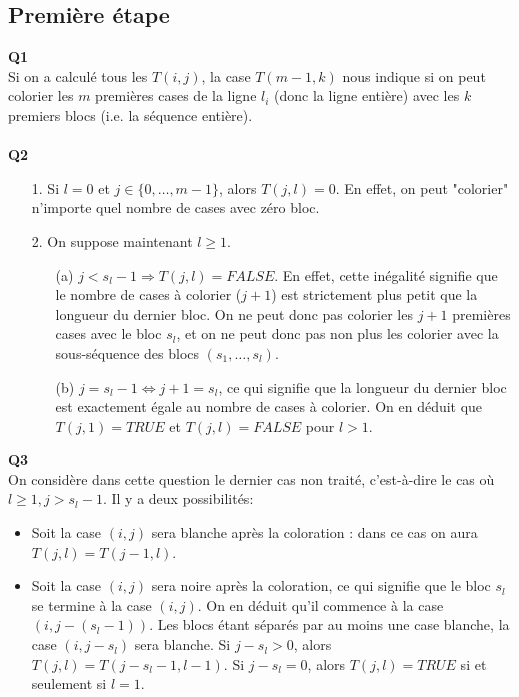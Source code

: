 \documentclass[10pt,a4paper]{article}
\begin{document}
\subsection{Première étape}
\noindent \textbf{Q1} \\
Si on a calculé tous les $T(i,j)$, la case $T(m-1, k)$ nous indique si on peut colorier les $m$ premières cases de la ligne $l_i$ (donc la ligne entière) avec les $k$ premiers blocs (i.e. la séquence entière). \\ \\
\noindent \textbf{Q2}
\begin{itemize}
\item[1.] Si $l = 0$ et $j \in \lbrace 0, \hdots, m-1 \rbrace$, alors $T(j,l) = 0$. En effet, on peut "colorier" n'importe quel nombre de cases avec zéro bloc. \\ 
\item[2.] On suppose maintenant $l \geq 1$.
	\begin{itemize}
		\item[(a)] $j < s_l -1 \Rightarrow T(j,l) = FALSE$. En effet, cette inégalité signifie que le nombre de cases à colorier ($j+1$) est strictement plus petit que la longueur du dernier bloc. On ne peut donc pas colorier les $j+1$ premières cases avec le bloc $s_l$, et on ne peut donc pas non plus les colorier avec la sous-séquence des blocs $(s_1, \hdots, s_l)$. 
		\item[(b)] $j = s_l -1 \Leftrightarrow j+1 = s_l$, ce qui signifie que la longueur du dernier bloc est exactement égale au nombre de cases à colorier. On en déduit que $T(j,1) = TRUE$ et $T(j,l) = FALSE$ pour $l > 1$. 
	\end{itemize}
\end{itemize}
\noindent
\textbf{Q3} \\
On considère dans cette question le dernier cas non traité, c'est-à-dire le cas où $l \geq 1, j > s_l -1$. Il y a deux possibilités: 
\begin{itemize}
	\item Soit la case $(i,j)$ sera blanche après la coloration : dans ce cas on aura $T(j,l) = T(j-1,l)$. 
	\item Soit la case $(i,j)$ sera noire après la coloration, ce qui signifie que le bloc $s_l$ se termine à la case $(i,j)$. On en déduit qu'il commence à la case $(i, j - (s_l -1))$. Les blocs étant séparés par au moins une case blanche, la case $(i, j-s_l)$ sera blanche. Si $j-s_l > 0$, alors $T(j, l) = T(j-s_l -1, l-1)$. Si $j-s_l = 0$, alors $T(j,l) = TRUE$ si et seulement si $l = 1$.  
\end{itemize}  
\end{document}
